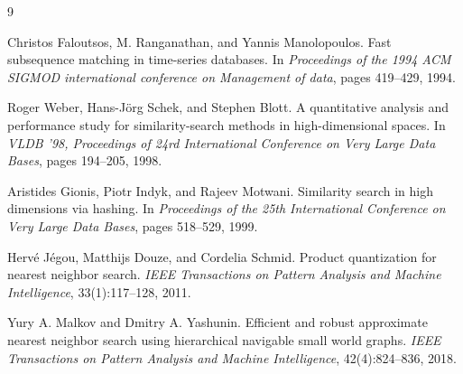\documentclass[sigconf,nonacm]{acmart}
\begin{document}
\begin{thebibliography}{9}

Christos Faloutsos, M. Ranganathan, and Yannis Manolopoulos.
\newblock Fast subsequence matching in time-series databases.
\newblock In \emph{Proceedings of the 1994 ACM SIGMOD international conference on Management of data}, pages 419--429, 1994.

Roger Weber, Hans-Jörg Schek, and Stephen Blott.
\newblock A quantitative analysis and performance study for similarity-search methods in high-dimensional spaces.
\newblock In \emph{VLDB '98, Proceedings of 24rd International Conference on Very Large Data Bases}, pages 194--205, 1998.

Aristides Gionis, Piotr Indyk, and Rajeev Motwani.
\newblock Similarity search in high dimensions via hashing.
\newblock In \emph{Proceedings of the 25th International Conference on Very Large Data Bases}, pages 518--529, 1999.

Hervé Jégou, Matthijs Douze, and Cordelia Schmid.
\newblock Product quantization for nearest neighbor search.
\newblock \emph{IEEE Transactions on Pattern Analysis and Machine Intelligence}, 33(1):117--128, 2011.

Yury A. Malkov and Dmitry A. Yashunin.
\newblock Efficient and robust approximate nearest neighbor search using hierarchical navigable small world graphs.
\newblock \emph{IEEE Transactions on Pattern Analysis and Machine Intelligence}, 42(4):824--836, 2018.

\end{thebibliography}
\end{document}
